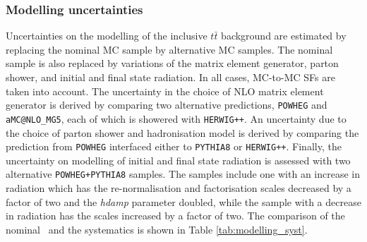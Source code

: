 \documentclass[letterpaper,12pt]{article}
\begin{document}
\subsubsection{Modelling uncertainties} Uncertainties on the modelling of the inclusive $t\bar{t}$ 
background are estimated by replacing the nominal MC sample by alternative MC samples. The nominal 
sample is also replaced by variations of the matrix element generator, parton shower, and initial 
and final state radiation. In all cases, MC-to-MC SFs are taken into account. The uncertainty in 
the choice of NLO matrix element generator is derived by comparing two alternative predictions, 
{\tt POWHEG} and {\tt aMC@NLO\_MG5}, each of which is showered with {\tt HERWIG++}. An uncertainty 
due to the choice of parton shower and hadronisation model is derived by comparing the prediction 
from {\tt POWHEG} interfaced either to {\tt PYTHIA8} or {\tt HERWIG++}. Finally, the uncertainty on 
modelling of initial and final state radiation is assessed with two alternative {\tt POWHEG+PYTHIA8} 
samples. The samples include one with an increase in radiation which has the re-normalisation and 
factorisation scales decreased by a factor of two and the \textit{hdamp} parameter doubled, while 
the sample with a decrease in radiation has the scales increased by a factor of two. The comparison of 
the nominal \ttbar\ and the systematics is shown in Table \ref{tab:modelling_syst}.
\end{document}
